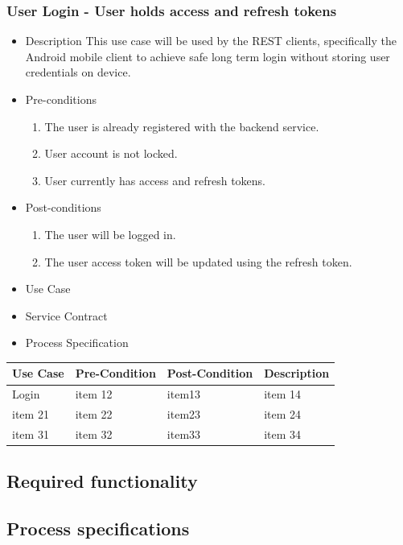 \documentclass[a4paper,10pt]{article}
\begin{document}
\subsubsection{User Login - User holds access and refresh tokens}
	\begin{itemize}
		\item Description
		This use case will be used by the REST clients, specifically the Android mobile client to achieve safe long term login without storing user credentials on device. 
		\item Pre-conditions
			\begin{enumerate}
				\item The user is already registered with the backend service.
				\item User account is not locked.
				\item User currently has access and refresh tokens.
			\end{enumerate}
		\item Post-conditions
			\begin{enumerate}
				\item The user will be logged in.
				\item The user access token will be updated using the refresh token.
			\end{enumerate}
		\item Use Case
		\item Service Contract
		\item Process Specification
	\end{itemize}
	
\begin{tabu} to \textwidth { | X[l] | X[l] | X[l] | X[l] | }
	\hline
		Use Case		& Pre-Condition		& Post-Condition		& Description	\\ \hline \hline
		Login		& item 12			& item13				& item 14  \\ \hline
		item 21		& item 22			& item23				& item 24  \\ \hline
		item 31		& item 32			& item33				& item 34  \\
	\hline
\end{tabu}

\subsection{Required functionality}

\subsection{Process specifications}
\end{document}
